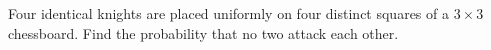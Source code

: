 Four identical knights are placed uniformly on four distinct squares of a $3\times3$ chessboard. Find the probability that no two attack each other.
